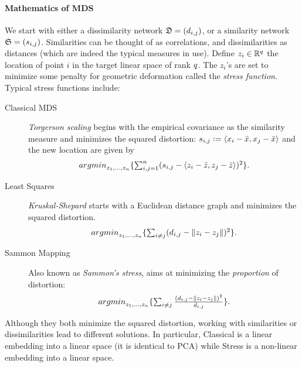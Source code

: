 \documentclass[12pt,a4paper]{article}
\begin{document}
\paragraph{Mathematics of MDS}
We start with either a dissimilarity network $\mathfrak{D}=(d_{i,j})$, or a similarity network $\mathfrak{S}=(s_{i,j})$.
Similarities can be thought of as correlations, and dissimilarities as distances (which are indeed the typical measures in use).
Define $z_i \in \mathbb{R}^q$ the location of point $i$ in the target linear space of rank $q$. 
The $z_i$'s are set to minimize some penalty for geometric deformation called the \emph{stress function}.
Typical stress functions include:
\begin{description}
	
	\item[Classical MDS] \Aka \emph{Torgerson scaling} begins with the empirical covariance as the similarity measure and minimizes the squared distortion:
	$s_{i,j}:= \left< x_i-\bar x,x_j-\bar{x} \right>$ and the new location are given by
	\begin{align}
	\label{eq:mds_classical}
	\textstyle{\mathop{argmin}_{z_1,\dots,z_n}}\{ \sum_{i,j=1}^{n} (s_{i,j}-\left< z_i-\bar z,z_j-\bar{z} \right> )^2 \}.
	\end{align}
	
	\item[Least Squares] \Aka \emph{Kruskal-Shepard} starts with a Euclidean distance graph and minimizes the squared distortion. 
	\begin{align}
	\label{eq:mds_stress}
	\textstyle{\mathop{argmin}_{z_1,\dots,z_n}}\{ \sum_{i \neq j} (d_{i,j}-\Vert z_i-z_j \Vert )^2 \}.
	\end{align}
	
	\item[Sammon Mapping] Also known as \emph{Sammon's stress}, aims at minimizing the \emph{proportion} of distortion:
	\begin{align}
	\label{eq:mds_sammon}
	\textstyle{\mathop{argmin}_{z_1,\dots,z_n}}\{ \sum_{i \neq j} \frac{(d_{i,j}-\Vert z_i-z_j \Vert )^2}{d_{i,j}} \}.
	\end{align}
	
\end{description}


\begin{remark}
	Although they both minimize the squared distortion, working with similarities or dissimilarities lead to different solutions. 
	In particular, Classical is a linear embedding into a linear space (it is identical to PCA) while Stress is a non-linear embedding into a linear space. 
\end{remark}
\end{document}
